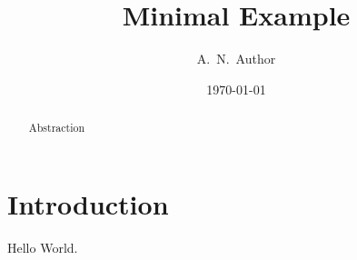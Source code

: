 \documentclass[modern]{lsstdescnote}
\begin{document}
\title{Minimal Example}
\author{A.\ N.\ Author}
\date{\today}

\begin{abstract}
  Abstraction
\end{abstract}

\maketitle

\section{Introduction}
Hello World.
\end{document}
